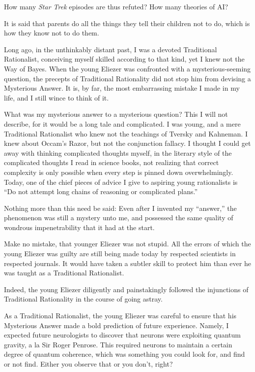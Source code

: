 {
 How many \textit{Star Trek} episodes are thus refuted? How many
theories of AI?}

\myendsectiontext


\bigskip


{
 It is said that parents do all the things they tell their children
not to do, which is how they know not to do them. }

{
 Long ago, in the unthinkably distant past, I was a devoted
Traditional Rationalist, conceiving myself skilled according to that
kind, yet I knew not the Way of Bayes. When the young Eliezer was
confronted with a mysterious-seeming question, the precepts of
Traditional Rationality did not stop him from devising a Mysterious
Answer. It is, by far, the most embarrassing mistake I made in my life,
and I still wince to think of it.}

{
 What was my mysterious answer to a mysterious question? This I
will not describe, for it would be a long tale and complicated. I was
young, and a mere Traditional Rationalist who knew not the teachings of
Tversky and Kahneman. I knew about Occam's Razor, but
not the conjunction fallacy. I thought I could get away with thinking
complicated thoughts myself, in the literary style of the complicated
thoughts I read in science books, not realizing that correct complexity
is only possible when every step is pinned down overwhelmingly. Today,
one of the chief pieces of advice I give to aspiring young rationalists
is ``Do not attempt long chains of reasoning or
complicated plans.''}

{
 Nothing more than this need be said: Even after I invented my
``answer,'' the phenomenon was still
a mystery unto me, and possessed the same quality of wondrous
impenetrability that it had at the start.}

{
 Make no mistake, that younger Eliezer was not stupid. All the
errors of which the young Eliezer was guilty are still being made today
by respected scientists in respected journals. It would have taken a
subtler skill to protect him than ever he was taught as a Traditional
Rationalist.}

{
 Indeed, the young Eliezer diligently and painstakingly followed
the injunctions of Traditional Rationality in the course of going
astray.}

{
 As a Traditional Rationalist, the young Eliezer was careful to
ensure that his Mysterious Answer made a bold prediction of future
experience. Namely, I expected future neurologists to discover that
neurons were exploiting quantum gravity, a la Sir Roger Penrose. This
required neurons to maintain a certain degree of quantum coherence,
which was something you could look for, and find or not find. Either
you observe that or you don't, right?}

